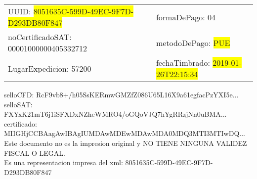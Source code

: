 \documentclass{article}
\begin{document}
\begin{tabular}{p{11cm}p{1cm}p{8cm}}
\bigskip
UUID: \colorbox{yellow}{ 8051635C-599D-49EC-9F7D-D293DB80F847 } & & formaDePago: 04\\

noCertificadoSAT: 00001000000405332712 & & metodoDePago: \colorbox{yellow}{ PUE }\\

LugarExpedicion: 57200 & & fechaTimbrado: \colorbox{yellow}{ 2019-01-26T22:15:34 } \\
\end{tabular}

\bigskip
selloCFD: RcF9vb8+/h05SsKERmwGMZfZ086U65L16X9a61egfacPzYXI5e... \\
selloSAT: FXYxK21mT6j1iSFXDxNZheWMRO4/oGQoVJQ7hYgRRzjNn0uBMA... \\

certificado: MIIGHjCCBAagAwIBAgIUMDAwMDEwMDAwMDA0MDQ3MTI3MTIwDQ...\bigskip\bigskip\bigskip\bigskip\bigskip\bigskip
\\Este documento no es la impresion original y NO TIENE NINGUNA VALIDEZ FISCAL O LEGAL. \\
 Es una representacion impresa del xml:  8051635C-599D-49EC-9F7D-D293DB80F847 \\
\end{document}
